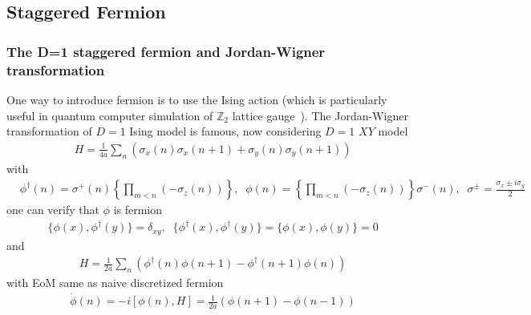\subsection{\label{sec:staggered_fermion}Staggered Fermion}

\subsubsection{\label{sec:jordanWigner1D}The D=1 staggered fermion and Jordan-Wigner transformation}

One way to introduce fermion is to use the Ising action (which is particularly useful in quantum computer simulation of $\mathbb{Z}_2$ lattice gauge~\cite{staggeredfermionInQuamtumSimulation}). The Jordan-Wigner transformation of $D=1$ Ising model is famous, now considering $D=1$ $XY$ model
\begin{equation}
\begin{split}
&H=\frac{1}{4a}\sum _n \left(\sigma _x(n)\sigma _x(n+1)+\sigma _y(n)\sigma _y(n+1)\right)
\end{split}
\end{equation}
with
\begin{equation}
\begin{split}
&\phi ^{\dagger}(n)=\sigma ^+(n)\left\{\prod _{m<n}(-\sigma _z(n))\right\},\;\;\phi (n)=\left\{\prod _{m<n}(-\sigma _z(n))\right\}\sigma ^-(n),\;\;\sigma ^{\pm}=\frac{\sigma _x\pm i\sigma _y}{2}
\end{split}
\end{equation}
one can verify that $\phi$ is fermion
\begin{equation}
\begin{split}
&\{\phi (x),\phi^{\dagger} (y)\} = \delta _{xy},\;\; \{\phi^{\dagger} (x),\phi^{\dagger} (y)\}=\{\phi (x),\phi (y)\}=0
\end{split}
\end{equation}
and
\begin{equation}
\begin{split}
&H=\frac{1}{2a}\sum _n \left(\phi ^{\dagger}(n)\phi(n+1) -\phi ^{\dagger}(n+1)\phi(n)\right)
\end{split}
\end{equation}
with EoM same as naive discretized fermion
\begin{equation}
\begin{split}
&\dot{\phi}(n)=-i[\phi (n), H]=\frac{1}{2a} \left(\phi (n+1)-\phi (n-1)\right)
\end{split}
\end{equation}

